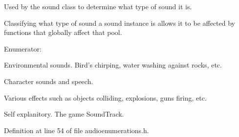 Used by the sound class to determine what type of sound it is. 

Classifying what type of sound a sound instance is allows it to be affected by functions that globally affect that pool. \begin{Desc}
\item[Enumerator: ]\par
\begin{description}
\item[{\em 
\hypertarget{namespaceMezzanine_1_1Audio_a316b2244b8be1a8c441a39b0a246295ead2a032a407e097b7bb7d5a385653aad0}{
ST\_\-Ambient}
\label{namespaceMezzanine_1_1Audio_a316b2244b8be1a8c441a39b0a246295ead2a032a407e097b7bb7d5a385653aad0}
}]Environmental sounds. Bird's chirping, water washing against rocks, etc. \item[{\em 
\hypertarget{namespaceMezzanine_1_1Audio_a316b2244b8be1a8c441a39b0a246295eae976bb4e3c6ed427af5bfa77a579d2c5}{
ST\_\-Dialog}
\label{namespaceMezzanine_1_1Audio_a316b2244b8be1a8c441a39b0a246295eae976bb4e3c6ed427af5bfa77a579d2c5}
}]Character sounds and speech. \item[{\em 
\hypertarget{namespaceMezzanine_1_1Audio_a316b2244b8be1a8c441a39b0a246295ea93feb4ba046a6f320ad48bf064efb939}{
ST\_\-Effect}
\label{namespaceMezzanine_1_1Audio_a316b2244b8be1a8c441a39b0a246295ea93feb4ba046a6f320ad48bf064efb939}
}]Various effects such as objects colliding, explosions, guns firing, etc. \item[{\em 
\hypertarget{namespaceMezzanine_1_1Audio_a316b2244b8be1a8c441a39b0a246295ea8b58a4bf5a48652cdb9108e0227adc70}{
ST\_\-Music}
\label{namespaceMezzanine_1_1Audio_a316b2244b8be1a8c441a39b0a246295ea8b58a4bf5a48652cdb9108e0227adc70}
}]Self explanitory. The game SoundTrack. \end{description}
\end{Desc}



Definition at line 54 of file audioenumerations.h.

